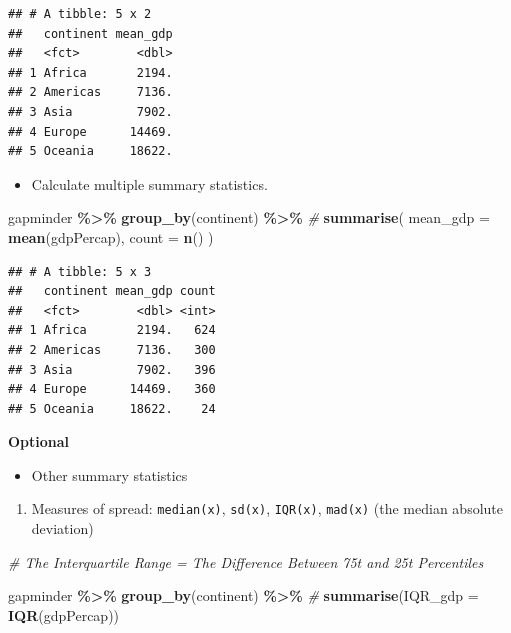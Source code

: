 \documentclass[
]{book}
\newenvironment{Shaded}{\begin{snugshade}}{\end{snugshade}}
\newcommand{\AttributeTok}[1]{\textcolor[rgb]{0.13,0.29,0.53}{#1}}
\newcommand{\CommentTok}[1]{\textcolor[rgb]{0.56,0.35,0.01}{\textit{#1}}}
\newcommand{\FunctionTok}[1]{\textcolor[rgb]{0.13,0.29,0.53}{\textbf{#1}}}
\newcommand{\NormalTok}[1]{#1}
\newcommand{\SpecialCharTok}[1]{\textcolor[rgb]{0.81,0.36,0.00}{\textbf{#1}}}
\providecommand{\tightlist}{%
  \setlength{\itemsep}{0pt}\setlength{\parskip}{0pt}}
\begin{document}
\begin{verbatim}
## # A tibble: 5 x 2
##   continent mean_gdp
##   <fct>        <dbl>
## 1 Africa       2194.
## 2 Americas     7136.
## 3 Asia         7902.
## 4 Europe      14469.
## 5 Oceania     18622.
\end{verbatim}

\begin{itemize}
\tightlist
\item
  Calculate multiple summary statistics.
\end{itemize}

\begin{Shaded}
\begin{Highlighting}[]
\NormalTok{gapminder }\SpecialCharTok{\%\textgreater{}\%}
  \FunctionTok{group\_by}\NormalTok{(continent) }\SpecialCharTok{\%\textgreater{}\%} \CommentTok{\#}
  \FunctionTok{summarise}\NormalTok{(}
    \AttributeTok{mean\_gdp =} \FunctionTok{mean}\NormalTok{(gdpPercap),}
    \AttributeTok{count =} \FunctionTok{n}\NormalTok{()}
\NormalTok{  )}
\end{Highlighting}
\end{Shaded}

\begin{verbatim}
## # A tibble: 5 x 3
##   continent mean_gdp count
##   <fct>        <dbl> <int>
## 1 Africa       2194.   624
## 2 Americas     7136.   300
## 3 Asia         7902.   396
## 4 Europe      14469.   360
## 5 Oceania     18622.    24
\end{verbatim}

\textbf{Optional}

\begin{itemize}
\tightlist
\item
  Other summary statistics
\end{itemize}

\begin{enumerate}
\def\labelenumi{\arabic{enumi}.}
\tightlist
\item
  Measures of spread: \texttt{median(x)}, \texttt{sd(x)}, \texttt{IQR(x)}, \texttt{mad(x)} (the median absolute deviation)
\end{enumerate}

\begin{Shaded}
\begin{Highlighting}[]
\CommentTok{\# The Interquartile Range = The Difference Between 75t and 25t Percentiles}

\NormalTok{gapminder }\SpecialCharTok{\%\textgreater{}\%}
  \FunctionTok{group\_by}\NormalTok{(continent) }\SpecialCharTok{\%\textgreater{}\%} \CommentTok{\#}
  \FunctionTok{summarise}\NormalTok{(}\AttributeTok{IQR\_gdp =} \FunctionTok{IQR}\NormalTok{(gdpPercap))}
\end{Highlighting}
\end{Shaded}
\end{document}
